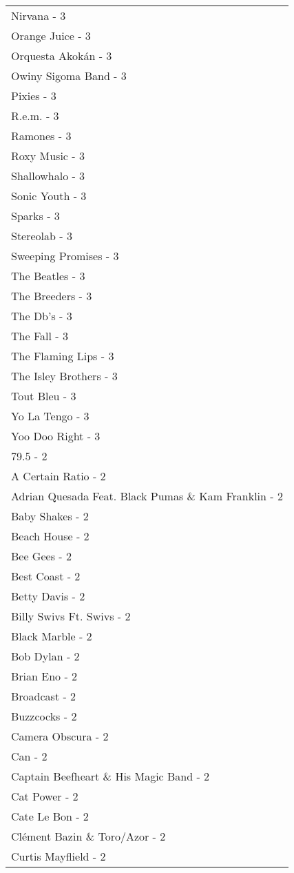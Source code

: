 \documentclass[
]{article}
\begin{document}
\begin{longtable}{l}
Nirvana - 3 \\ 
Orange Juice - 3 \\ 
Orquesta Akokán - 3 \\ 
Owiny Sigoma Band - 3 \\ 
Pixies - 3 \\ 
R.e.m. - 3 \\ 
Ramones - 3 \\ 
Roxy Music - 3 \\ 
Shallowhalo - 3 \\ 
Sonic Youth - 3 \\ 
Sparks - 3 \\ 
Stereolab - 3 \\ 
Sweeping Promises - 3 \\ 
The Beatles - 3 \\ 
The Breeders - 3 \\ 
The Db's - 3 \\ 
The Fall - 3 \\ 
The Flaming Lips - 3 \\ 
The Isley Brothers - 3 \\ 
Tout Bleu - 3 \\ 
Yo La Tengo - 3 \\ 
Yoo Doo Right - 3 \\ 
79.5 - 2 \\ 
A Certain Ratio - 2 \\ 
Adrian Quesada Feat. Black Pumas \& Kam Franklin - 2 \\ 
Baby Shakes - 2 \\ 
Beach House - 2 \\ 
Bee Gees - 2 \\ 
Best Coast - 2 \\ 
Betty Davis - 2 \\ 
Billy Swivs Ft. Swivs - 2 \\ 
Black Marble - 2 \\ 
Bob Dylan - 2 \\ 
Brian Eno - 2 \\ 
Broadcast - 2 \\ 
Buzzcocks - 2 \\ 
Camera Obscura - 2 \\ 
Can - 2 \\ 
Captain Beefheart \& His Magic Band - 2 \\ 
Cat Power - 2 \\ 
Cate Le Bon - 2 \\ 
Clément Bazin \& Toro/Azor - 2 \\ 
Curtis Mayflield - 2 \\ 

\end{longtable}
\end{document}
